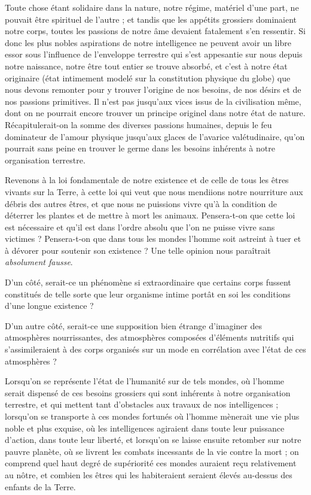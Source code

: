 \documentclass[a4paper, 11pt, oneside]{article}
\begin{document}
Toute chose étant solidaire dans la nature, notre régime, matériel d'une part, ne pouvait être spirituel de l'autre ; et tandis que les appétits grossiers dominaient notre corps, toutes les passions de notre âme devaient fatalement s'en ressentir. Si donc les plus nobles aspirations de notre intelligence ne peuvent avoir un libre essor sous l'influence de l'enveloppe terrestre qui s'est appesantie sur nous depuis notre naissance, notre être tout entier se trouve absorbé, et c'est à notre état originaire (état intimement modelé sur la constitution physique du globe) que nous devons remonter pour y trouver l'origine de nos besoins, de nos désirs et de nos passions primitives. Il n'est pas jusqu'aux vices issus de la civilisation même, dont on ne pourrait encore trouver un principe originel dans notre état de nature. Récapitulerait-on la somme des diverses passions humaines, depuis le feu dominateur de l'amour physique jusqu'aux glaces de l'avarice valétudinaire, qu'on pourrait sans peine en trouver le germe dans les besoins inhérents à notre organisation terrestre.

Revenons à la loi fondamentale de notre existence et de celle de tous les êtres vivants sur la Terre, à cette loi qui veut que nous mendiions notre nourriture aux débris des autres êtres, et que nous ne puissions vivre qu'à la condition de déterrer les plantes et de mettre à mort les animaux. Pensera-t-on que cette loi est nécessaire et qu'il est dans l'ordre absolu que l'on ne puisse vivre sans victimes ? Pensera-t-on que dans tous les mondes l'homme soit astreint à tuer et à dévorer pour soutenir son existence ? Une telle opinion nous paraîtrait \emph{absolument fausse}.

D'un côté, serait-ce un phénomène si extraordinaire que certains corps fussent constitués de telle sorte que leur organisme intime portât en soi les conditions d'une longue existence ?

D'un autre côté, serait-ce une supposition bien étrange d'imaginer des atmosphères nourrissantes, des atmosphères composées d'éléments nutritifs qui s'assimileraient à des corps organisés sur un mode en corrélation avec l'état de ces atmosphères ?

Lorsqu'on se représente l'état de l'humanité sur de tels mondes, où l'homme serait dispensé de ces besoins grossiers qui sont inhérents à notre organisation terrestre, et qui mettent tant d'obstacles aux travaux de nos intelligences ; lorsqu'on se transporte à ces mondes fortunés où l'homme mènerait une vie plus noble et plus exquise, où les intelligences agiraient dans toute leur puissance d'action, dans toute leur liberté, et lorsqu'on se laisse ensuite retomber sur notre pauvre planète, où se livrent les combats incessants de la vie contre la mort ; on comprend quel haut degré de supériorité ces mondes auraient reçu relativement au nôtre, et combien les êtres qui les habiteraient seraient élevés au-dessus des enfants de la Terre.
\end{document}
